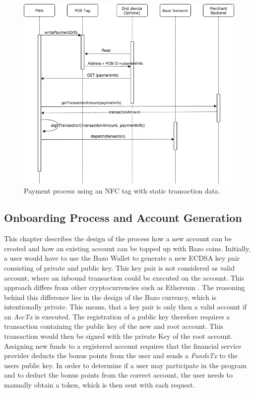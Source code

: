 \begin{figure}
\centering
\includegraphics[width=1\textwidth]{diagrams/POS_flow.png}
\caption{\label{fig:POS}Payment process using an NFC tag with static transaction data.}
\end{figure}

\subsection{Onboarding Process and Account Generation}\label{onboarding}
This chapter describes the design of the process how a new account can be created and how an existing account can be topped up with Bazo coins.
Initially, a user would have to use the Bazo Wallet to generate a new ECDSA key pair consisting of private and public key. This key pair is not considered as valid account, where an inbound transaction could be executed on the account. This approach differs from other cryptocurrencies such as Ethereum \cite{myethwallet}. The reasoning behind this difference lies in the design of the Bazo currency, which is intentionally private. This means, that a key pair is only then a valid account if an \textit{AccTx} is executed. The registration of a public key therefore requires a transaction containing the public key of the new and root account. This transaction would then be signed with the private Key of the root account.
Assigning new funds to a registered account requires that the financial service provider deducts the bonus points from the user and sends a \textit{FundsTx} to the users public key. In order to determine if a user may participate in the program and to deduct the bonus points from the correct account, the user needs to manually obtain a token, which is then sent with each request.


